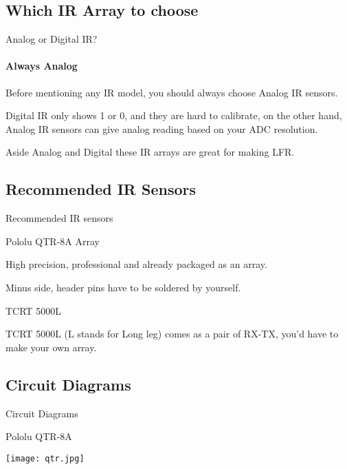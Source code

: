 \documentclass{beamer}
\begin{document}
	
	\subsection{Which IR Array to choose}
	\begin{frame}{Analog or Digital IR?}
	
	\framesubtitle{Always Analog}
	
	Before mentioning any IR model, you should always choose \alert{Analog IR} sensors. 
	
	\bigskip
	
	\alert{Digital IR} only shows 1 or 0, and they are hard to calibrate, on the other hand, \alert{Analog IR} sensors can give analog reading based on your ADC resolution.
	
	Aside \alert{Analog and Digital} these IR arrays are great for making LFR.

	
	\end{frame}
	
	\subsection{Recommended IR Sensors}
	\begin{frame}{Recommended IR sensors}
	
	\begin{alertblock}{Pololu QTR-8A Array}
	
	High precision, professional and already packaged as an array. 
	
	Minus side, header pins have to be soldered by yourself.
	
	\end{alertblock}

	\begin{alertblock}{TCRT 5000L}
	
	TCRT 5000L (L stands for Long leg) comes as a pair of RX-TX, you'd have to make your own array.
	
	\end{alertblock}	
	
	\end{frame}
	
	\subsection{Circuit Diagrams}
	\begin{frame}{Circuit Diagrams}
	
	\begin{alertblock}{Pololu QTR-8A}
		
			\texttt{[image: qtr.jpg]}
	
	\end{alertblock}	
	
	\end{frame}
	
\end{document}

